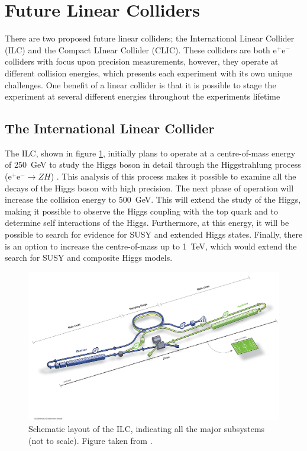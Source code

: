 
\section{Future Linear Colliders}
There are two proposed future linear colliders; the International Linear Collider (ILC) and the Compact LInear Collider (CLIC).  These colliders are both $\text{e}^{+}\text{e}^{-}$ colliders with focus upon precision measurements, however, they operate at different collision energies, which presents each experiment with its own unique challenges.  One benefit of a linear collider is that it is possible to stage the experiment at several different energies throughout the experiments lifetime


\subsection{The International Linear Collider}
The ILC, shown in figure \ref{fig:ilc}, initially plans to operate at a centre-of-mass energy of 250~GeV to study the Higgs boson in detail through the Higgstrahlung process ($\text{e}^{+}\text{e}^{-} \rightarrow ZH$) \cite{Behnke:2013xla}.  This analysis of this process makes it possible to examine all the decays of the Higgs boson with high precision.  The next phase of operation will increase the collision energy to 500~GeV.  This will extend the study of the Higgs, making it possible to observe the Higgs coupling with the top quark and to determine self interactions of the Higgs.  Furthermore, at this energy, it will be possible to search for evidence for SUSY and extended Higgs states.  Finally, there is an option to increase the centre-of-mass up to 1~TeV, which would extend the search for SUSY and composite Higgs models.

\begin{figure}[h!]
\includegraphics[width=1.0\textwidth]{Introduction/Plots/ILC.jpg}
\caption[Schematic layout of the ILC, indicating all the major subsystems (not to scale).  Figure taken from \cite{Behnke:2013xla}.]{Schematic layout of the ILC, indicating all the major subsystems (not to scale).  Figure taken from \cite{Behnke:2013xla}.}
\label{fig:ilc}
\end{figure}

